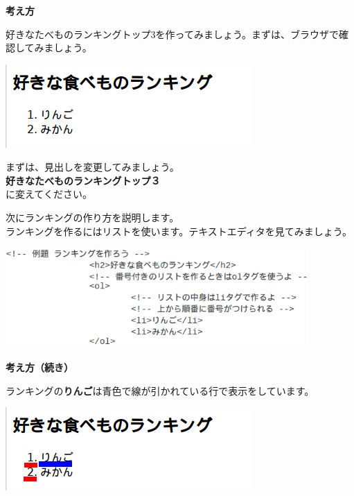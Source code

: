 \documentclass[a4paper,12pt]{jarticle}
\begin{document}
\bigskip


\bigskip

\textbf{考え方}



\bigskip



好きなたべものランキングトップ3を作ってみましょう。まずは、ブラウザで確認してみましょう。


\bigskip

\includegraphics[width=9.417cm,height=3.173cm]{textbook-img179.png}

\bigskip

まずは、見出しを変更してみましょう。\\
\textbf{好きなたべものランキングトップ３}\\
に変えてください。


\bigskip

次にランキングの作り方を説明します。\\
ランキングを作るにはリストを使います。テキストエディタを見てみましょう。

\centering
\includegraphics[width=11.553cm,height=3.812cm]{textbook-img180.png}

\clearpage
\flushleft
\textbf{考え方（続き）}


\bigskip


ランキングの\textbf{りんご}は青色で線が引かれている行で表示をしています。


\bigskip


\includegraphics[width=9.417cm,height=3.173cm]{textbook-img182.png}
\end{document}

